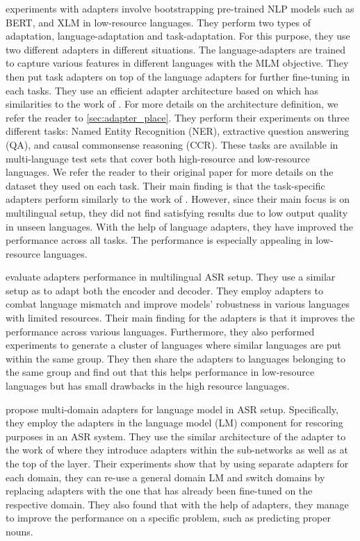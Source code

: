  experiments with adapters involve bootstrapping pre-trained NLP models such as BERT, and XLM  in low-resource languages. They perform two types of adaptation, language-adaptation and task-adaptation. For this purpose, they use two different adapters in different situations. The language-adapters are trained to capture various features in different languages with the MLM objective. They then put task adapters on top of the language adapters for further fine-tuning in each tasks. They use an efficient adapter architecture based on  which has similarities to the work of . For more details on the architecture definition, we refer the reader to \cref{sec:adapter_place}. They perform their experiments on three different tasks: Named Entity Recognition (NER), extractive question answering (QA), and causal commonsense reasoning (CCR). These tasks are available in multi-language test sets that cover both high-resource and low-resource languages. We refer the reader to their original paper for more details on the dataset they used on each task. Their main finding is that the task-specific adapters perform similarly to the work of . However, since their main focus is on multilingual setup, they did not find satisfying results due to low output quality in unseen languages. With the help of language adapters, they have improved the performance across all tasks. The performance is especially appealing in low-resource languages.

 evaluate adapters performance in multilingual ASR setup. They use a similar setup as  to adapt both the encoder and decoder. They employ adapters to combat language mismatch and improve models' robustness in various languages with limited resources. Their main finding for the adapters is that it improves the performance across various languages. Furthermore, they also performed experiments to generate a cluster of languages where similar languages are put within the same group. They then share the adapters to languages belonging to the same group and find out that this helps performance in low-resource languages but has small drawbacks in the high resource languages.

 propose multi-domain adapters for language model in ASR setup. Specifically, they employ the adapters in the language model (LM) component for rescoring purposes in an ASR system. They use the similar architecture of the adapter to the work of  where they introduce adapters within the sub-networks as well as at the top of the layer. Their experiments show that by using separate adapters for each domain, they can re-use a general domain LM and switch domains by replacing adapters with the one that has already been fine-tuned on the respective domain. They also found that with the help of adapters, they manage to improve the performance on a specific problem, such as predicting proper nouns.

